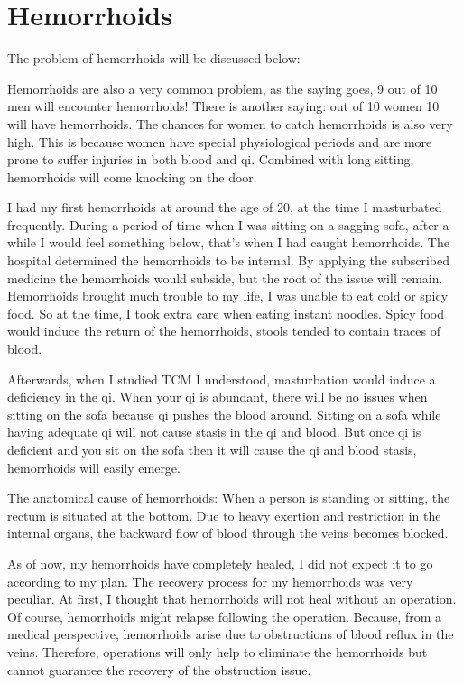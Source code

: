 \documentclass[
]{book}
\begin{document}
\hypertarget{hemorrhoids}{%
\section{Hemorrhoids}\label{hemorrhoids}}

The problem of hemorrhoids will be discussed below:

Hemorrhoids are also a very common problem, as the saying goes, 9 out of 10 men will encounter hemorrhoids! There is another saying: out of 10 women 10 will have hemorrhoids. The chances for women to catch hemorrhoids is also very high. This is because women have special physiological periods and are more prone to suffer injuries in both blood and qi. Combined with long sitting, hemorrhoids will come knocking on the door.

I had my first hemorrhoids at around the age of 20, at the time I masturbated frequently. During a period of time when I was sitting on a sagging sofa, after a while I would feel something below, that's when I had caught hemorrhoids. The hospital determined the hemorrhoids to be internal. By applying the subscribed medicine the hemorrhoids would subside, but the root of the issue will remain. Hemorrhoids brought much trouble to my life, I was unable to eat cold or spicy food. So at the time, I took extra care when eating instant noodles. Spicy food would induce the return of the hemorrhoids, stools tended to contain traces of blood.

Afterwards, when I studied TCM I understood, masturbation would induce a deficiency in the qi. When your qi is abundant, there will be no issues when sitting on the sofa because qi pushes the blood around. Sitting on a sofa while having adequate qi will not cause stasis in the qi and blood. But once qi is deficient and you sit on the sofa then it will cause the qi and blood stasis, hemorrhoids will easily emerge.

The anatomical cause of hemorrhoids: When a person is standing or sitting, the rectum is situated at the bottom. Due to heavy exertion and restriction in the internal organs, the backward flow of blood through the veins becomes blocked.

As of now, my hemorrhoids have completely healed, I did not expect it to go according to my plan. The recovery process for my hemorrhoids was very peculiar. At first, I thought that hemorrhoids will not heal without an operation. Of course, hemorrhoids might relapse following the operation. Because, from a medical perspective, hemorrhoids arise due to obstructions of blood reflux in the veins. Therefore, operations will only help to eliminate the hemorrhoids but cannot guarantee the recovery of the obstruction issue.
\end{document}

